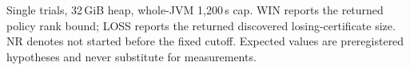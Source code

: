 {\par\smallskip\footnotesize Single trials, 32\,GiB heap, whole-JVM 1,200\,s cap. WIN reports the returned policy rank bound; LOSS reports the returned discovered losing-certificate size. NR denotes not started before the fixed cutoff. Expected values are preregistered hypotheses and never substitute for measurements.}
